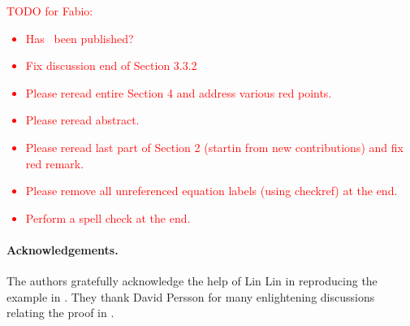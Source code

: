 \documentclass[11pt]{article}
\begin{document}
\textcolor{red}{TODO for Fabio:
\begin{itemize}
 \item Has~\cite{bhattacharjee-2024-improved-spectral} been published?
 \item Fix discussion end of Section 3.3.2
 \item Please reread entire Section 4 and address various red points.
 \item Please reread abstract.
 \item Please reread last part of Section 2 (startin from new contributions) and fix red remark.
 \item Please remove all unreferenced equation labels (using checkref) at the end.
 \item Perform a spell check at the end.
\end{itemize}
}






\paragraph{Acknowledgements.} The authors gratefully acknowledge the help of Lin Lin in reproducing the example in . They thank David Persson for many enlightening discussions relating the proof in .

\printbibliography


\end{document}
